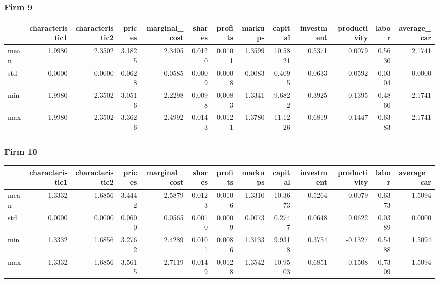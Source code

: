  \subsubsection*{Firm 9}
\begin{tabular}{lrrrrrrrrrrrr}
\toprule
{} &  characteristic1 &  characteristic2 &  prices &  marginal\_cost &  shares &  profits &  markups &  capital &  investment &  productivity &  labor &  average\_car \\
\midrule
mean &           1.9980 &           2.3502 &  3.1825 &         2.3405 &  0.0120 &   0.0101 &   1.3599 &  10.5821 &      0.5371 &        0.0079 & 0.5630 &       2.1741 \\
std  &           0.0000 &           0.0000 &  0.0628 &         0.0585 &  0.0009 &   0.0008 &   0.0083 &   0.4095 &      0.0633 &        0.0592 & 0.0304 &       0.0000 \\
min  &           1.9980 &           2.3502 &  3.0516 &         2.2298 &  0.0098 &   0.0083 &   1.3341 &   9.6822 &      0.3925 &       -0.1395 & 0.4860 &       2.1741 \\
max  &           1.9980 &           2.3502 &  3.3626 &         2.4992 &  0.0143 &   0.0121 &   1.3780 &  11.1226 &      0.6819 &        0.1447 & 0.6383 &       2.1741 \\
\bottomrule
\end{tabular}


 \subsubsection*{Firm 10}
\begin{tabular}{lrrrrrrrrrrrr}
\toprule
{} &  characteristic1 &  characteristic2 &  prices &  marginal\_cost &  shares &  profits &  markups &  capital &  investment &  productivity &  labor &  average\_car \\
\midrule
mean &           1.3332 &           1.6856 &  3.4442 &         2.5879 &  0.0123 &   0.0106 &   1.3310 &  10.3673 &      0.5264 &        0.0079 & 0.6373 &       1.5094 \\
std  &           0.0000 &           0.0000 &  0.0600 &         0.0565 &  0.0010 &   0.0009 &   0.0073 &   0.2747 &      0.0648 &        0.0622 & 0.0389 &       0.0000 \\
min  &           1.3332 &           1.6856 &  3.2762 &         2.4289 &  0.0101 &   0.0086 &   1.3133 &   9.9318 &      0.3754 &       -0.1327 & 0.5488 &       1.5094 \\
max  &           1.3332 &           1.6856 &  3.5615 &         2.7119 &  0.0149 &   0.0128 &   1.3542 &  10.9503 &      0.6851 &        0.1508 & 0.7309 &       1.5094 \\
\bottomrule
\end{tabular}



